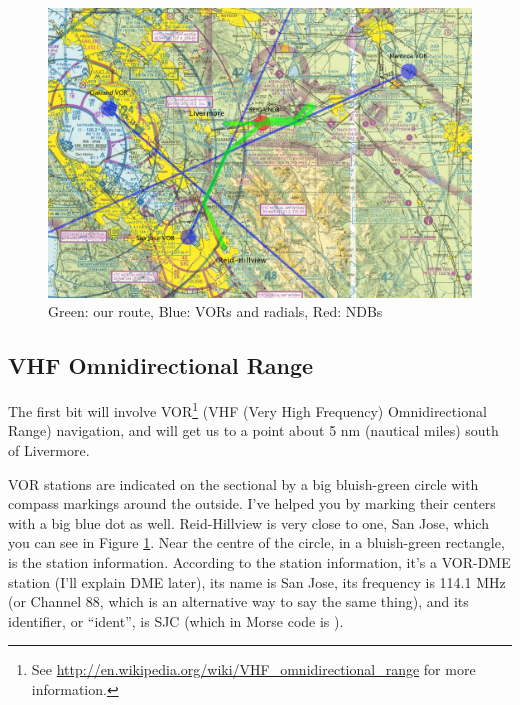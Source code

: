 \begin{figure}
  \begin{center}
    \includegraphics[width=20cm, angle=-90]{img/sectional_labelled}
    \caption{Green: our route, Blue: VORs and radials, Red: NDBs}
    \label{fig:sectional_labelled}
  \end{center}
\end{figure}


\subsection{VHF Omnidirectional Range}

The first bit will involve
VOR\footnote{See \url{http://en.wikipedia.org/wiki/VHF_omnidirectional_range}
for more information.} (VHF (Very High Frequency) Omnidirectional
Range) navigation, and will get us to a point about 5 nm (nautical
miles) south of Livermore.

VOR stations are indicated on the sectional by a big bluish-green
circle with compass markings around the outside.  I've helped you by
marking their centers with a big blue dot as well.  Reid-Hillview is
very close to one, San Jose, which you can see in Figure
\ref{fig:sectional_labelled}.  Near the centre of the circle, in a
bluish-green rectangle, is the station information.  According to the
station information, it's a VOR-DME station (I'll explain DME later),
its name is San Jose, its frequency is 114.1 MHz (or Channel 88, which
is an alternative way to say the same thing), and its identifier, or
``ident'', is SJC (which in Morse code is \mdot\mdot\mdot\mspace
\mdot\mdash\mdash\mdash\mspace \mdash\mdot\mdash\mdot).


